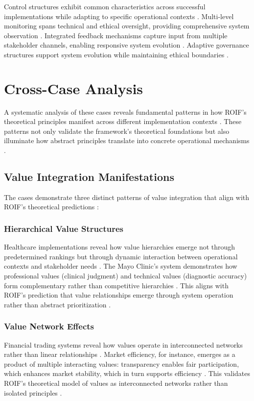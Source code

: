 \documentclass[12pt]{article}
\begin{document}
Control structures exhibit common characteristics across successful implementations while adapting to specific operational contexts \parencite{desanctis1994}. Multi-level monitoring spans technical and ethical oversight, providing comprehensive system observation \parencite{yeung2018}. Integrated feedback mechanisms capture input from multiple stakeholder channels, enabling responsive system evolution \parencite{friedman2008}. Adaptive governance structures support system evolution while maintaining ethical boundaries \parencite{dignum2019}.

\section{Cross-Case Analysis}

A systematic analysis of these cases reveals fundamental patterns in how ROIF's theoretical principles manifest across different implementation contexts \parencite{eisenhardt1989,yin2018}. These patterns not only validate the framework's theoretical foundations but also illuminate how abstract principles translate into concrete operational mechanisms \parencite{miles2014}.

\subsection{Value Integration Manifestations}

The cases demonstrate three distinct patterns of value integration that align with ROIF's theoretical predictions \parencite{stake2005}:

\subsubsection{Hierarchical Value Structures}
Healthcare implementations reveal how value hierarchies emerge not through predetermined rankings but through dynamic interaction between operational contexts and stakeholder needs \parencite{sittig2010}. The Mayo Clinic's system demonstrates how professional values (clinical judgment) and technical values (diagnostic accuracy) form complementary rather than competitive hierarchies \parencite{bates2003}. This aligns with ROIF's prediction that value relationships emerge through system operation rather than abstract prioritization \parencite{vandepoel2013}.

\subsubsection{Value Network Effects}
Financial trading systems reveal how values operate in interconnected networks rather than linear relationships \parencite{mackenzie2006}. Market efficiency, for instance, emerges as a product of multiple interacting values: transparency enables fair participation, which enhances market stability, which in turn supports efficiency \parencite{pasquale2015}. This validates ROIF's theoretical model of values as interconnected networks rather than isolated principles \parencite{friedman2019}.
\end{document}
